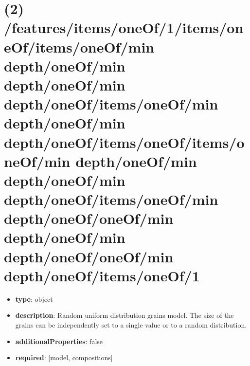 \section{(2) /features/items/oneOf/1/items/oneOf/items/oneOf/min depth/oneOf/min depth/oneOf/min depth/oneOf/items/oneOf/min depth/oneOf/min depth/oneOf/items/oneOf/items/oneOf/min depth/oneOf/min depth/oneOf/min depth/oneOf/items/oneOf/min depth/oneOf/oneOf/min depth/oneOf/min depth/oneOf/oneOf/min depth/oneOf/items/oneOf/1}
\begin{itemize}[leftmargin=2em]\item {\bf type}: object
\item {\bf description}: Random uniform distribution grains model. The size of the grains can be independently set to a single value or to a random distribution.
\item {\bf additionalProperties}: false
\item {\bf required}: [model, compositions]\end{itemize}
